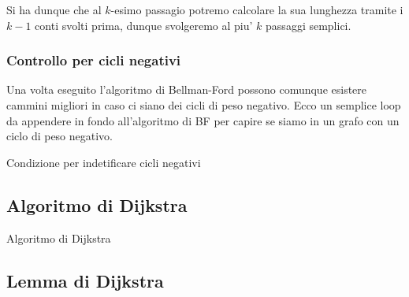 \documentclass{article}
\begin{document}
Si ha dunque che al $k$-esimo passagio potremo calcolare la sua lunghezza tramite
i $k-1$ conti svolti prima, dunque svolgeremo al piu' $k$ passaggi semplici.

\subsubsection{Controllo per cicli negativi}

Una volta eseguito l'algoritmo di Bellman-Ford possono comunque esistere cammini
migliori in caso ci siano dei cicli di peso negativo. Ecco un semplice loop
da appendere in fondo all'algoritmo di BF per capire se siamo in un grafo con
un ciclo di peso negativo.

\begin{algorithm}[H]
  \caption{Condizione per indetificare cicli negativi}
\end{algorithm}

\subsection{Algoritmo di Dijkstra}

\begin{algorithm}[H]
  \caption{Algoritmo di Dijkstra}
\end{algorithm}

\subsection{Lemma di Dijkstra}
\end{document}
